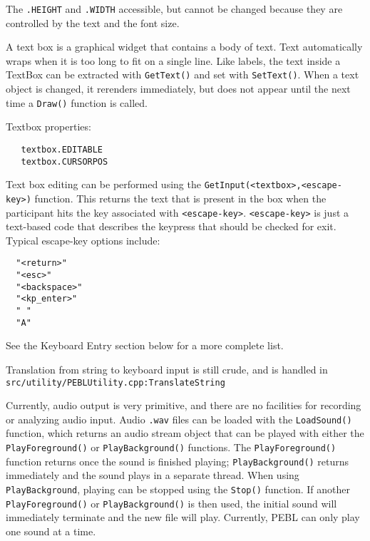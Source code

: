 The \verb+.HEIGHT+ and \verb+.WIDTH+ accessible, but cannot be changed
because they are controlled by the text and the font size.



A text box is a graphical widget that contains a body of text.  Text
automatically wraps when it is too long to fit on a single line.  Like
labels, the text inside a TextBox can be extracted with
\texttt{GetText()} and set with \texttt{SetText()}. When a text object
is changed, it rerenders immediately, but does not appear until the
next time a \texttt{Draw()} function is called.


Textbox properties:
\begin{verbatim}
   textbox.EDITABLE
   textbox.CURSORPOS 
\end{verbatim}
 



Text box editing can be performed using the \verb+GetInput(<textbox>,<escape-key>)+ function.  This returns the text that is present in the box when the participant hits the key associated with \verb+<escape-key>+.  
\verb+<escape-key>+ is just a text-based code that describes the keypress 
that should be checked for exit. Typical escape-key options include:
\begin{verbatim}
  "<return>"
  "<esc>"
  "<backspace>"
  "<kp_enter>"
  " "
  "A"
\end{verbatim}
 
See the Keyboard Entry section below for a more complete list.

Translation from string to keyboard input is still crude, 
and is handled in \texttt{src/utility/PEBLUtility.cpp:TranslateString} 

\newpage
{}

Currently, audio output is very primitive, and there are no facilities for recording or analyzing audio input. Audio \texttt{.wav} files can be loaded with the \texttt{LoadSound()} function, which returns an audio stream object that can be played  with either the \texttt{PlayForeground()} or \texttt{PlayBackground()} functions.  
The \texttt{PlayForeground()} function returns once the sound is finished playing; \texttt{PlayBackground()} returns immediately and the sound plays in a separate thread.  When using \texttt{PlayBackground}, playing can be stopped using the \texttt{Stop()} function.  If another \texttt{PlayForeground()} or \texttt{PlayBackground()} is then used,
the initial sound will immediately terminate and the new file will play. Currently, PEBL can only play one sound at a time.


